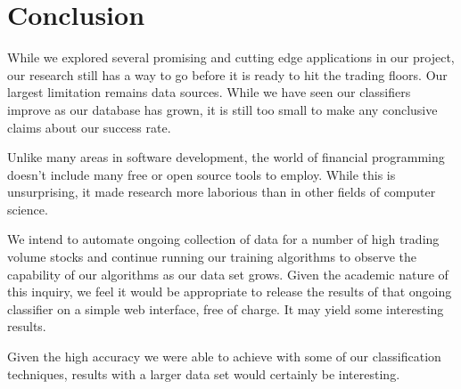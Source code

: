 \documentclass[letterpaper]{article}
\begin{document}
\section{Conclusion}

\noindent While we explored several promising and cutting edge applications in our project, our research still has a way to go before it is ready to hit the trading floors. Our largest limitation remains data sources.  While we have seen our classifiers improve as our database has grown, it is still too small to make any conclusive claims about our success rate.

Unlike many areas in software development, the world of financial programming doesn't include many free or open source tools to employ. While this is unsurprising, it made research more laborious than in other fields of computer science.

We intend to automate ongoing collection of data for a number of high trading volume stocks and continue running our training algorithms to observe the capability of our algorithms as our data set grows. Given the academic nature of this inquiry, we feel it would be appropriate to release the results of that ongoing classifier on a simple web interface, free of charge.  It may yield some interesting results.

Given the high accuracy we were able to achieve with some of our classification techniques, results with a larger data set would certainly be interesting. 
\end{document}
